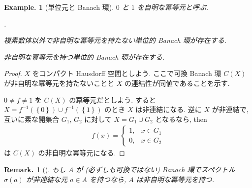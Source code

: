 \documentclass[openany, a4paper, oneside]{jsbook}
\newcounter{enum2}
\renewenvironment{enumerate}{%
\begin{list}%
{%
\arabic{enum2}.\ \,%
}%
{%
\usecounter{enum2}
\setlength{\itemindent}{0pt}%
\setlength{\leftmargin}{15pt}%
\setlength{\rightmargin}{0pt}%
\setlength{\labelsep}{0pt}%
\setlength{\labelwidth}{6pt}%
\setlength{\itemsep}{0pt}%
\setlength{\parsep}{0pt}%
\setlength{\listparindent}{0pt}%
}
}{%
\end{list}%
}
\theoremstyle{break}
\theoremstyle{breakdefn}
\newtheorem{ex}[thm]{Example.}
\newtheorem{rem}[thm]{Remark.}
\newcommand{\rbk}[1]{\left (#1\right)}
\newcommand{\cbk}[1]{\left\{#1\right\}}
\begin{document}
\begin{ex}[単位元と Banach 環]\label{counterexamples-analysis-moslehian1}
$0$ と $1$ を自明な冪等元と呼ぶ.
\begin{enumerate}
\item 複素数体以外で非自明な冪等元を持たない単位的 Banach 環が存在する.
\item 非自明な冪等元を持つ単位的 Banach 環が存在する.
\end{enumerate}
\end{ex}
\begin{proof}
$X$ をコンパクト Hausdorff 空間としよう.
ここで可換 Banach 環 $C(X)$ が非自明な冪等元を持たないことと $X$ の連結性が同値であることを示す.

$0 \neq f \neq 1$ を $C(X)$ の冪等元だとしよう.
すると $X = f^{-1} \rbk{\cbk{0}} \cup f^{-1} \rbk{\cbk{1}}$ のとき $X$ は非連結になる.
逆に $X$ が非連結で, 互いに素な開集合 $G_1$, $G_2$ に対して $X = G_1 \cup G_2$ となるなら,
then
\begin{align}
 f(x)
 =
 \begin{cases}
  1, & x \in G_1 \\
  0, & x \in G_2
 \end{cases}
\end{align}
は $C(X)$ の非自明な冪等元になる.
\end{proof}
\begin{rem}[{\cite[Remarks of Prop. 7.9]{BonsallDuncan1}}]
もし $A$ が (必ずしも可換ではない) Banach 環でスペクトル
$\sigma (a)$ が非連結な元 $a \in A$ を持つなら,
$A$ は非自明な冪等元を持つ.
\end{rem}
\end{document}
